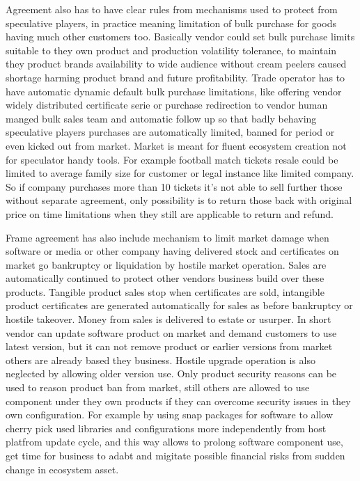 Agreement also has to have clear rules from mechanisms used to protect from speculative players, in practice meaning limitation of bulk purchase for goods having much other customers too. Basically vendor could set bulk purchase limits suitable to they own product and production volatility tolerance, to maintain they product brands availability to wide audience without cream peelers caused shortage harming product brand and future profitability. Trade operator has to have automatic dynamic default bulk purchase limitations, like offering vendor widely distributed certificate serie or purchase redirection to vendor human manged bulk sales team and automatic follow up so that badly behaving speculative players purchases are automatically limited, banned for period or even kicked out from market. Market is meant for fluent ecosystem creation not for speculator handy tools. For example football match tickets resale could be limited to average family size for customer or legal instance like limited company. So if company purchases more than 10 tickets it's not able to sell further those without separate agreement, only possibility is to return those back with original price on time limitations when they still are applicable to return and refund. 

Frame agreement has also include mechanism to limit market damage when software or media or other company having delivered stock and certificates on market go bankruptcy or liquidation by hostile market operation. Sales are automatically continued to protect other vendors business build over these products. Tangible product sales stop when certificates are sold, intangible product certificates are generated automatically for sales as before bankruptcy or hostile takeover. Money from sales is delivered to estate or usurper. In short vendor can update software product on market and demand customers to use latest version, but it can not remove product or earlier versions from market others are already based they business. Hostile upgrade operation is also neglected by allowing older version use. Only product security reasons can be used to reason product ban from market, still others are allowed to use component under they own products if they can overcome security issues in they own configuration. For example by using snap packages for software to allow cherry pick used libraries and configurations more independently from host platfrom update cycle, and this way allows to prolong software component use, get time for business to adabt and migitate possible financial risks from sudden change in ecosystem asset.

